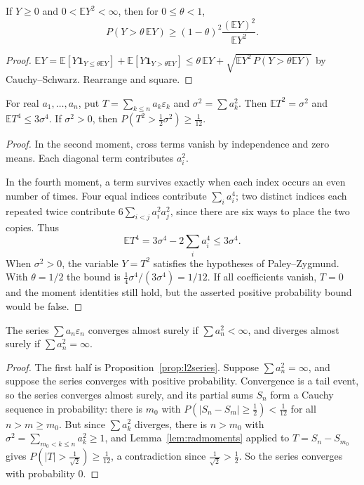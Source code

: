 \begin{lemma}\label{lem:pz}
If $Y\ge0$ and $0<\mathbb E Y^2<\infty$, then for $0\le\theta<1$,
\[
P(Y>\theta\,\mathbb E Y)\ge(1-\theta)^2\frac{(\mathbb E Y)^2}{\mathbb E Y^2}.
\]
\end{lemma}
\begin{proof}
$\mathbb E Y=\mathbb E[Y\mathbf 1_{Y\le\theta\mathbb E Y}]+\mathbb E[Y\mathbf 1_{Y>\theta\mathbb E Y}]\le\theta\,\mathbb E Y+
\sqrt{\mathbb E Y^2\,P(Y>\theta\mathbb E Y)}$ by Cauchy--Schwarz. Rearrange and square.
\end{proof}

\begin{lemma}\label{lem:radmoments}
For real $a_1,\dots,a_n$, put $T=\sum_{k\le n}a_k\varepsilon_k$ and $\sigma^2=\sum a_k^2$. Then $\mathbb E T^2=\sigma^2$ and $\mathbb E T^4\le3\sigma^4$. If $\sigma^2>0$, then $P(T^2>\frac12\sigma^2)\ge\frac1{12}$.
\end{lemma}
\begin{proof}
In the second moment, cross terms vanish by independence and zero means. Each diagonal term contributes $a_i^2$.

In the fourth moment, a term survives exactly when each index occurs an even number of times. Four equal indices contribute $\sum_i a_i^4$; two distinct indices each repeated twice contribute $6\sum_{i<j}a_i^2a_j^2$, since there are six ways to place the two copies. Thus
\[
\mathbb E T^4=3\sigma^4-2\sum_i a_i^4\le3\sigma^4.
\]
When $\sigma^2>0$, the variable $Y=T^2$ satisfies the hypotheses of Paley--Zygmund. With $\theta=1/2$ the bound is $\frac14\sigma^4/(3\sigma^4)=1/12$. If all coefficients vanish, $T=0$ and the moment identities still hold, but the asserted positive probability bound would be false.
\end{proof}

\begin{theorem}\label{thm:rademacher}
The series $\sum a_n\varepsilon_n$ converges almost surely if $\sum a_n^2<\infty$, and diverges almost surely if $\sum a_n^2=\infty$.
\end{theorem}
\begin{proof}
The first half is Proposition~\ref{prop:l2series}. Suppose $\sum a_n^2=\infty$, and suppose the series converges with positive
probability. Convergence is a tail event, so the series converges almost surely, and its partial sums $S_n$ form a Cauchy
sequence in probability: there is $m_0$ with $P(|S_n-S_m|\ge\frac12)<\frac1{12}$ for all $n>m\ge m_0$. But since $\sum a_k^2$
diverges, there is $n>m_0$ with $\sigma^2=\sum_{m_0<k\le n}a_k^2\ge1$, and Lemma~\ref{lem:radmoments} applied to
$T=S_n-S_{m_0}$ gives $P(|T|>\frac1{\sqrt2})\ge\frac1{12}$, a contradiction since $\frac1{\sqrt2}>\frac12$. So the series
converges with probability $0$.
\end{proof}

